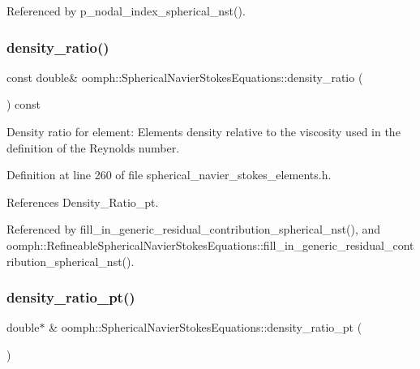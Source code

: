 Referenced by p\+\_\+nodal\+\_\+index\+\_\+spherical\+\_\+nst().

\mbox{\label{classoomph_1_1SphericalNavierStokesEquations_a64fc30a2f613c7d0bbd5db7ad8bd27c8}} 
\subsubsection{\texorpdfstring{density\+\_\+ratio()}{density\_ratio()}}
{\footnotesize\ttfamily const double\& oomph\+::\+Spherical\+Navier\+Stokes\+Equations\+::density\+\_\+ratio (\begin{DoxyParamCaption}{ }\end{DoxyParamCaption}) const\hspace{0.3cm}{\ttfamily [inline]}}



Density ratio for element\+: Element\textquotesingle{}s density relative to the viscosity used in the definition of the Reynolds number. 



Definition at line 260 of file spherical\+\_\+navier\+\_\+stokes\+\_\+elements.\+h.



References Density\+\_\+\+Ratio\+\_\+pt.



Referenced by fill\+\_\+in\+\_\+generic\+\_\+residual\+\_\+contribution\+\_\+spherical\+\_\+nst(), and oomph\+::\+Refineable\+Spherical\+Navier\+Stokes\+Equations\+::fill\+\_\+in\+\_\+generic\+\_\+residual\+\_\+contribution\+\_\+spherical\+\_\+nst().

\mbox{\label{classoomph_1_1SphericalNavierStokesEquations_a6128ac34480c1d31531ef4010f755ace}} 
\subsubsection{\texorpdfstring{density\+\_\+ratio\+\_\+pt()}{density\_ratio\_pt()}}
{\footnotesize\ttfamily double$\ast$ \& oomph\+::\+Spherical\+Navier\+Stokes\+Equations\+::density\+\_\+ratio\+\_\+pt (\begin{DoxyParamCaption}{ }\end{DoxyParamCaption})\hspace{0.3cm}{\ttfamily [inline]}}



